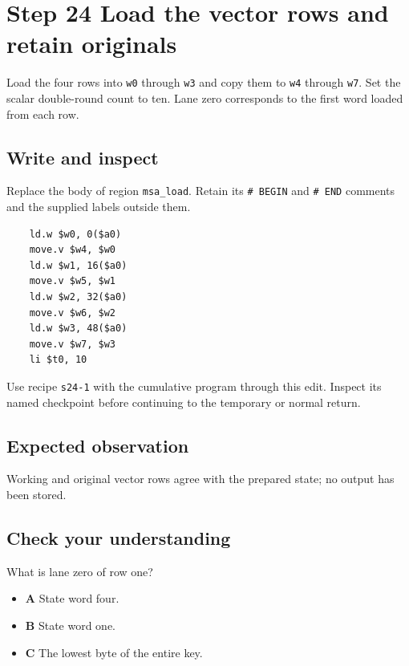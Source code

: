 \section{Step 24 Load the vector rows and retain originals}\label{chacha-s24}

Load the four rows into \texttt{w0} through \texttt{w3} and copy them to \texttt{w4} through \texttt{w7}. Set the scalar double-round count to ten. Lane zero corresponds to the first word loaded from each row.

\subsection{Write and inspect}
Replace the body of region \texttt{msa\_load}. Retain its \texttt{\# BEGIN} and \texttt{\# END} comments and the supplied labels outside them.

\begin{verbatim}
    ld.w $w0, 0($a0)
    move.v $w4, $w0
    ld.w $w1, 16($a0)
    move.v $w5, $w1
    ld.w $w2, 32($a0)
    move.v $w6, $w2
    ld.w $w3, 48($a0)
    move.v $w7, $w3
    li $t0, 10
\end{verbatim}

Use recipe \texttt{s24-1} with the cumulative program through this edit. Inspect its named checkpoint before continuing to the temporary or normal return.

\subsection{Expected observation}
Working and original vector rows agree with the prepared state; no output has been stored.

\subsection{Check your understanding}
What is lane zero of row one?

\begin{itemize}
\item \textbf{A} State word four.
\item \textbf{B} State word one.
\item \textbf{C} The lowest byte of the entire key.
\end{itemize}
